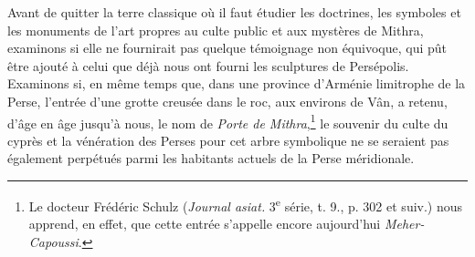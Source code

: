 \documentclass{article}
\begin{document}
Avant de quitter la terre classique où il faut étudier les doctrines, les symboles et les monuments de l'art propres au culte public et aux mystères de Mithra, examinons si elle ne fournirait pas quelque témoignage non équivoque, qui pût être ajouté à celui que déjà nous ont fourni les sculptures de Persépolis. Examinons si, en même temps que, dans une province d'Arménie limitrophe de la Perse, l'entrée d'une grotte creusée dans le roc, aux environs de Vân, a retenu, d'âge en âge jusqu'à nous, le nom de \emph{Porte de Mithra},\footnote{Le docteur Frédéric Schulz (\emph{Journal asiat.} 3\textsuperscript{e} série, t. 9., p. 302 et suiv.) nous apprend, en effet, que cette entrée s'appelle encore aujourd'hui \emph{Meher-Capoussi}.} le souvenir du culte du cyprès et la vénération des Perses pour cet arbre symbolique ne se seraient pas également perpétués parmi les habitants actuels de la Perse méridionale.
\end{document}
